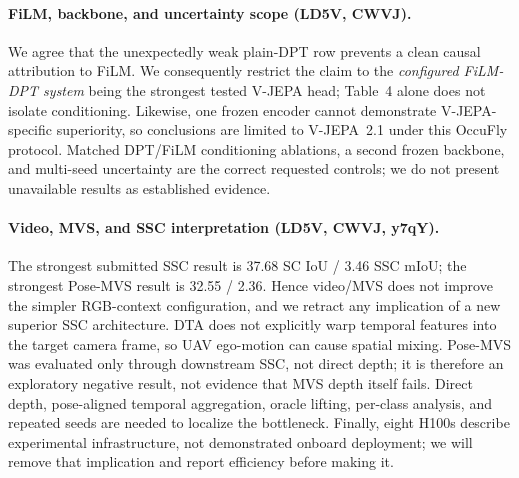 \documentclass[10pt,twocolumn,letterpaper]{article}
\begin{document}
\paragraph{FiLM, backbone, and uncertainty scope (LD5V, CWVJ).}
We agree that the unexpectedly weak plain-DPT row prevents a clean causal attribution to
FiLM. We consequently restrict the claim to the \emph{configured FiLM-DPT system} being
the strongest tested V-JEPA head; Table~4 alone does not isolate conditioning. Likewise,
one frozen encoder cannot demonstrate V-JEPA-specific superiority, so conclusions are
limited to V-JEPA~2.1 under this OccuFly protocol. Matched DPT/FiLM conditioning ablations,
a second frozen backbone, and multi-seed uncertainty are the correct requested controls;
we do not present unavailable results as established evidence.

\paragraph{Video, MVS, and SSC interpretation (LD5V, CWVJ, y7qY).}
The strongest submitted SSC result is 37.68 SC IoU / 3.46 SSC mIoU; the strongest
Pose-MVS result is 32.55 / 2.36. Hence video/MVS does not improve the simpler RGB-context
configuration, and we retract any implication of a new superior SSC architecture. DTA
does not explicitly warp temporal features into the target camera frame, so UAV ego-motion
can cause spatial mixing. Pose-MVS was evaluated only through downstream SSC, not direct
depth; it is therefore an exploratory negative result, not evidence that MVS depth itself
fails. Direct depth, pose-aligned temporal aggregation, oracle lifting, per-class analysis,
and repeated seeds are needed to localize the bottleneck. Finally, eight H100s describe
experimental infrastructure, not demonstrated onboard deployment; we will remove that
implication and report efficiency before making it.
\end{document}
